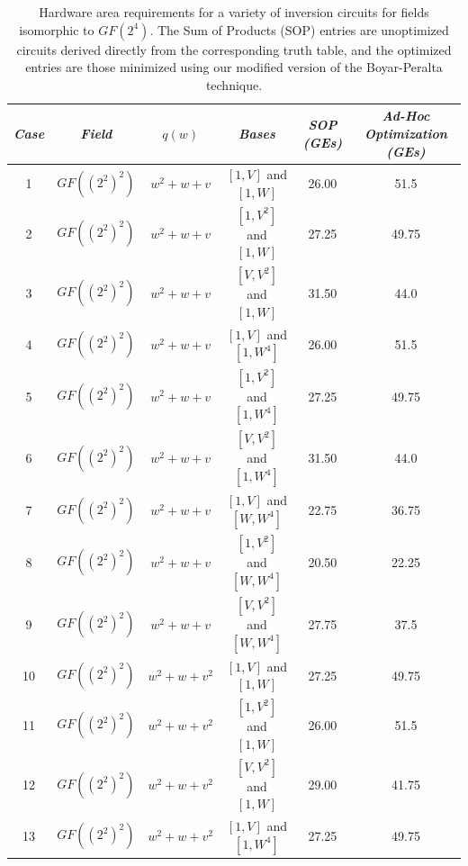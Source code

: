 
\begin{table} 
\begin{center}
\scriptsize
	\caption{Hardware area requirements for a variety of inversion circuits for fields isomorphic to $GF(2^4)$. The Sum of Products (SOP) entries are unoptimized circuits derived directly from the corresponding truth table, and the optimized entries are those minimized using our modified version of the Boyar-Peralta technique.}
	\label{tab:inverseCircuitMinimized}
	\begin{tabular}{| c | c | c | c | c | c | } \hline  
	\emph{Case} & \emph{Field} & $q(w)$ & \emph{Bases} & \emph{SOP (GEs)} & \emph{Ad-Hoc Optimization (GEs)} \\ \hline
	1 & $GF((2^2)^2)$ & $w^2 + w + v$ & $[1, V]$ and $[1, W]$         & 26.00 & 51.5      \\
	2 & $GF((2^2)^2)$ & $w^2 + w + v$ & $[1, V^2]$ and $[1, W]$       & 27.25 & 49.75     \\
	3 & $GF((2^2)^2)$ & $w^2 + w + v$ & $[V, V^2]$ and $[1, W]$       & 31.50 & 44.0      \\
	4 & $GF((2^2)^2)$ & $w^2 + w + v$ & $[1, V]$ and $[1, W^4]$       & 26.00 & 51.5      \\
	5 & $GF((2^2)^2)$ & $w^2 + w + v$ & $[1, V^2]$ and $[1, W^4]$     & 27.25 & 49.75     \\
	6 & $GF((2^2)^2)$ & $w^2 + w + v$ & $[V, V^2]$ and $[1, W^4]$     & 31.50 & 44.0      \\
	7 & $GF((2^2)^2)$ & $w^2 + w + v$ & $[1, V]$ and $[W, W^4]$       & 22.75 & 36.75     \\
	8 & $GF((2^2)^2)$ & $w^2 + w + v$ & $[1, V^2]$ and $[W, W^4]$     & 20.50 & 22.25     \\
	9 & $GF((2^2)^2)$ & $w^2 + w + v$ & $[V, V^2]$ and $[W, W^4]$     & 27.75 & 37.5      \\
	10 & $GF((2^2)^2)$ & $w^2 + w + v^2$ & $[1, V]$ and $[1, W]$       & 27.25 & 49.75     \\
	11 & $GF((2^2)^2)$ & $w^2 + w + v^2$ & $[1, V^2]$ and $[1, W]$     & 26.00 & 51.5      \\
	12 & $GF((2^2)^2)$ & $w^2 + w + v^2$ & $[V, V^2]$ and $[1, W]$     & 29.00 & 41.75     \\
	13 & $GF((2^2)^2)$ & $w^2 + w + v^2$ & $[1, V]$ and $[1, W^4]$     & 27.25 & 49.75     \\

\end{tabular}
\end{center}
\end{table}
